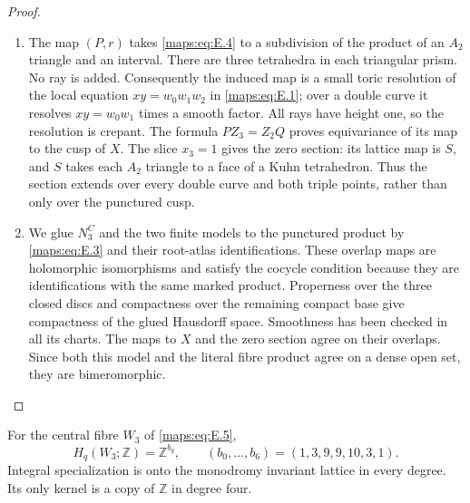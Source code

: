 \begin{proof}
\begin{enumerate}[label=\arabic*.,leftmargin=*]
\item The map $(P,r)$ takes \eqref{maps:eq:E.4} to a subdivision of the product of an
$A_2$ triangle and an interval.  There are three tetrahedra in each
triangular prism.  No ray is added.  Consequently the induced map is
a small toric resolution of the local equation
$xy=w_0w_1w_2$ in \eqref{maps:eq:E.1}; over a double curve it resolves
$xy=w_0w_1$ times a smooth factor.  All rays have height one, so the
resolution is crepant.  The formula $PZ_3=Z_2Q$ proves equivariance
of its map to the cusp of $X$.  The slice $x_3=1$ gives the zero
section: its lattice map is $S$, and $S$ takes each $A_2$ triangle
to a face of a Kuhn tetrahedron.  Thus the section extends over every
double curve and both triple points, rather than only over the
punctured cusp.

\item We glue $N_3^C$ and the two finite models to the punctured product by
\eqref{maps:eq:E.3} and their root-atlas identifications.  These overlap maps are
holomorphic isomorphisms and satisfy the cocycle condition because
they are identifications with the same marked product.  Properness
over the three closed discs and compactness over the remaining compact
base give compactness of the glued Hausdorff space.  Smoothness has
been checked in all its charts.  The maps to $X$ and the zero section
agree on their overlaps.  Since both this model and the literal
fibre product agree on a dense open set, they are bimeromorphic.
\end{enumerate}
\end{proof}

\begin{theorem}\label{maps:src:E.1.3}


For the central fibre $W_3$ of \eqref{maps:eq:E.5},
\[
 H_q(W_3;\mathbb Z)=\mathbb Z^{b_q},\qquad
 (b_0,\ldots,b_6)=(1,3,9,9,10,3,1).
 \tag{E.6}\label{maps:eq:E.6}
\]
Integral specialization is onto the monodromy invariant lattice in
every degree.  Its only kernel is a copy of $\mathbb Z$ in degree four.

\end{theorem}


